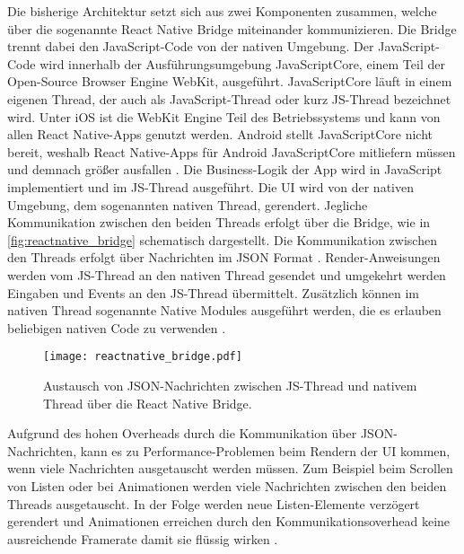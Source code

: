 Die bisherige Architektur setzt sich aus zwei Komponenten zusammen, welche über die sogenannte React Native Bridge miteinander kommunizieren.
Die Bridge trennt dabei den JavaScript-Code von der nativen Umgebung.
Der JavaScript-Code wird innerhalb der Ausführungsumgebung JavaScriptCore, einem Teil der Open-Source Browser Engine WebKit, ausgeführt.
JavaScriptCore läuft in einem eigenen Thread, der auch als JavaScript-Thread oder kurz JS-Thread bezeichnet wird.
Unter iOS ist die WebKit Engine Teil des Betriebssystems und kann von allen React Native-Apps genutzt werden.
Android stellt JavaScriptCore nicht bereit, weshalb React Native-Apps für Android JavaScriptCore mitliefern müssen und demnach größer ausfallen \cite{Dragomir_ReactNative,Nawrocki_Comparison_Hybrid_Native_Frameworks}.
Die Business-Logik der App wird in JavaScript implementiert und im JS-Thread ausgeführt.
Die \ac{UI} wird von der nativen Umgebung, dem sogenannten nativen Thread, gerendert.
Jegliche Kommunikation zwischen den beiden Threads erfolgt über die Bridge, wie in \autoref{fig:reactnative_bridge} schematisch dargestellt.
Die Kommunikation zwischen den Threads erfolgt über Nachrichten im \ac{JSON} Format \cite{ReactNative_newArchitecture,Dragomir_ReactNative}.
Render-Anweisungen werden vom JS-Thread an den nativen Thread gesendet und umgekehrt werden Eingaben und Events an den JS-Thread übermittelt.
Zusätzlich können im nativen Thread sogenannte Native Modules ausgeführt werden, die es erlauben beliebigen nativen Code zu verwenden \cite{ReactNative_TurboModules}.
\begin{figure}[ht]
  \centering
  \texttt{[image: reactnative\_bridge.pdf]}
  \caption{Austausch von JSON-Nachrichten zwischen JS-Thread und nativem Thread über die  React Native Bridge.}
  \label{fig:reactnative_bridge}
\end{figure}

Aufgrund des hohen Overheads durch die Kommunikation über \ac{JSON}-Nachrichten, kann es zu Performance-Problemen beim Rendern der \ac{UI} kommen, wenn viele Nachrichten ausgetauscht werden müssen.
Zum Beispiel beim Scrollen von Listen oder bei Animationen werden viele Nachrichten zwischen den beiden Threads ausgetauscht.
In der Folge werden neue Listen-Elemente verzögert gerendert und Animationen erreichen durch den Kommunikationsoverhead keine ausreichende Framerate damit sie flüssig wirken \cite{Cook_ReactNativeBridge}.


